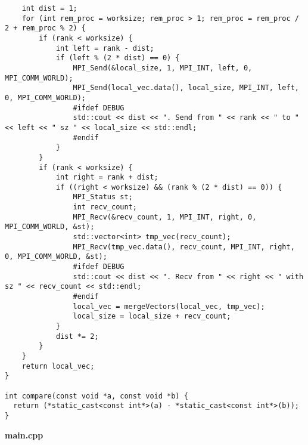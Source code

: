 \documentclass{report}
\begin{document}
\begin{lstlisting}
    int dist = 1;
    for (int rem_proc = worksize; rem_proc > 1; rem_proc = rem_proc / 2 + rem_proc % 2) {
        if (rank < worksize) {
            int left = rank - dist;
            if (left % (2 * dist) == 0) {
                MPI_Send(&local_size, 1, MPI_INT, left, 0, MPI_COMM_WORLD);
                MPI_Send(local_vec.data(), local_size, MPI_INT, left, 0, MPI_COMM_WORLD);
                #ifdef DEBUG
                std::cout << dist << ". Send from " << rank << " to " << left << " sz " << local_size << std::endl;
                #endif
            }
        }
        if (rank < worksize) {
            int right = rank + dist;
            if ((right < worksize) && (rank % (2 * dist) == 0)) {
                MPI_Status st;
                int recv_count;
                MPI_Recv(&recv_count, 1, MPI_INT, right, 0, MPI_COMM_WORLD, &st);
                std::vector<int> tmp_vec(recv_count);
                MPI_Recv(tmp_vec.data(), recv_count, MPI_INT, right, 0, MPI_COMM_WORLD, &st);
                #ifdef DEBUG
                std::cout << dist << ". Recv from " << right << " with sz " << recv_count << std::endl;
                #endif
                local_vec = mergeVectors(local_vec, tmp_vec);
                local_size = local_size + recv_count;
            }
            dist *= 2;
        }
    }
    return local_vec;
}

int compare(const void *a, const void *b) {
  return (*static_cast<const int*>(a) - *static_cast<const int*>(b));
}
	\end{lstlisting}
	\textbf{main.cpp}
\end{document}
